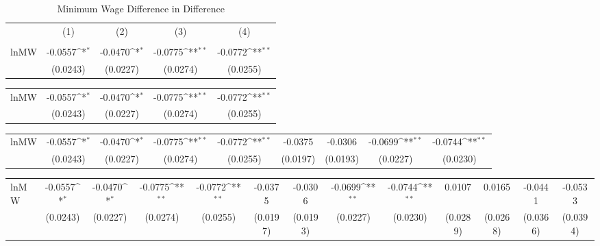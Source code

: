 \begin{table}[htbp]\centering
\def\sym#1{\ifmmode^{#1}\else\(^{#1}\)\fi}
\caption{Minimum Wage Difference in Difference\label{auto}}
\begin{tabular}{l*{4}{c}}
\hline\hline
                    &\multicolumn{1}{c}{(1)}&\multicolumn{1}{c}{(2)}&\multicolumn{1}{c}{(3)}&\multicolumn{1}{c}{(4)}\\
                    &\multicolumn{1}{c}{ }&\multicolumn{1}{c}{ }&\multicolumn{1}{c}{ }&\multicolumn{1}{c}{ }\\
\hline
lnMW                &     -0.0557\sym{*}  &     -0.0470\sym{*}  &     -0.0775\sym{**} &     -0.0772\sym{**} \\
                    &    (0.0243)         &    (0.0227)         &    (0.0274)         &    (0.0255)         \\
\hline\hline
\end{tabular}
\end{table}
{
\def\sym#1{\ifmmode^{#1}\else\(^{#1}\)\fi}
\begin{tabular}{l*{4}{c}}
\hline\hline
\hline
lnMW                &     -0.0557\sym{*}  &     -0.0470\sym{*}  &     -0.0775\sym{**} &     -0.0772\sym{**} \\
                    &    (0.0243)         &    (0.0227)         &    (0.0274)         &    (0.0255)         \\
\hline\hline
\end{tabular}
}
{
\def\sym#1{\ifmmode^{#1}\else\(^{#1}\)\fi}
\begin{tabular}{l*{8}{c}}
\hline\hline
\hline
lnMW                &     -0.0557\sym{*}  &     -0.0470\sym{*}  &     -0.0775\sym{**} &     -0.0772\sym{**} &     -0.0375         &     -0.0306         &     -0.0699\sym{**} &     -0.0744\sym{**} \\
                    &    (0.0243)         &    (0.0227)         &    (0.0274)         &    (0.0255)         &    (0.0197)         &    (0.0193)         &    (0.0227)         &    (0.0230)         \\
\hline\hline
\end{tabular}
}
{
\def\sym#1{\ifmmode^{#1}\else\(^{#1}\)\fi}
\begin{tabular}{l*{12}{c}}
\hline\hline
\hline
lnMW                &     -0.0557\sym{*}  &     -0.0470\sym{*}  &     -0.0775\sym{**} &     -0.0772\sym{**} &     -0.0375         &     -0.0306         &     -0.0699\sym{**} &     -0.0744\sym{**} &      0.0107         &      0.0165         &     -0.0441         &     -0.0533         \\
                    &    (0.0243)         &    (0.0227)         &    (0.0274)         &    (0.0255)         &    (0.0197)         &    (0.0193)         &    (0.0227)         &    (0.0230)         &    (0.0289)         &    (0.0268)         &    (0.0366)         &    (0.0394)         \\
\hline\hline
\end{tabular}
}
